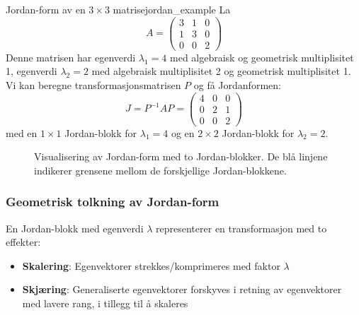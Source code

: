 \begin{example}{Jordan-form av en \(3 \times 3\) matrise}{jordan_example}
	La
	\[
		A = \begin{pmatrix} 3 & 1 & 0 \\ 1 & 3 & 0 \\ 0 & 0 & 2 \end{pmatrix}
	\]
	Denne matrisen har egenverdi $\lambda_1 = 4$ med algebraisk og geometrisk multiplisitet 1, egenverdi $\lambda_2 = 2$ med algebraisk multiplisitet 2 og geometrisk multiplisitet 1. Vi kan beregne transformasjonsmatrisen $P$ og få Jordanformen:
	\[
		J = P^{-1}AP = \begin{pmatrix} 4 & 0 & 0 \\ 0 & 2 & 1 \\ 0 & 0 & 2 \end{pmatrix}
	\]
	med en $1 \times 1$ Jordan-blokk for $\lambda_1 = 4$ og en $2 \times 2$ Jordan-blokk for $\lambda_2 = 2$.
\end{example}

\begin{figure}
	\centering
	\caption{Visualisering av Jordan-form med to Jordan-blokker. De blå linjene indikerer grensene mellom de forskjellige Jordan-blokkene.}
	\label{fig:jordan_form}
\end{figure}

\subsubsection{Geometrisk tolkning av Jordan-form}
En Jordan-blokk med egenverdi $\lambda$ representerer en transformasjon med to effekter:
\begin{itemize}
	\item \textbf{Skalering}: Egenvektorer strekkes/komprimeres med faktor $\lambda$
	\item \textbf{Skjæring}: Generaliserte egenvektorer forskyves i retning av egenvektorer med lavere rang, i tillegg til å skaleres
\end{itemize}

